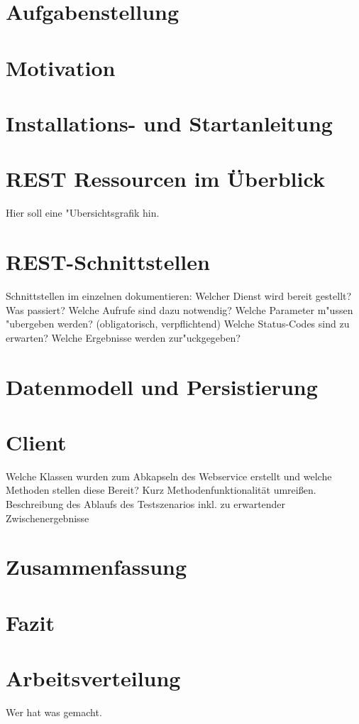 \documentclass[12pt]{scrartcl}
\begin{document}
\chapter{Aufgabenstellung}
\chapter{Motivation}
\chapter{Installations- und Startanleitung}
\chapter{REST Ressourcen im Überblick}
Hier soll eine "Ubersichtsgrafik hin.
\chapter{REST-Schnittstellen}
 Schnittstellen im einzelnen dokumentieren:
 Welcher Dienst wird bereit gestellt? Was passiert?
 Welche Aufrufe sind dazu notwendig?
 Welche Parameter m"ussen "ubergeben werden? (obligatorisch, verpflichtend)
 Welche Status-Codes sind zu erwarten?
 Welche Ergebnisse werden zur"uckgegeben? 
\chapter{Datenmodell und Persistierung}
\chapter{Client}
Welche Klassen wurden zum Abkapseln des Webservice erstellt und welche Methoden
stellen diese Bereit? Kurz Methodenfunktionalität umreißen.
Beschreibung des Ablaufs des Testszenarios inkl. zu erwartender Zwischenergebnisse
\chapter{Zusammenfassung}
\chapter{Fazit}
\chapter{Arbeitsverteilung}
Wer hat was gemacht.
\end{document}
